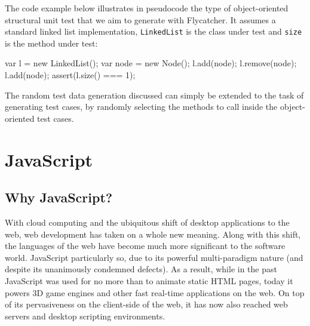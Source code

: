The code example below illustrates in pseudocode the type of object-oriented structural unit test that we aim to generate with \textsf{Flycatcher}. It assumes a standard linked list implementation, \texttt{LinkedList} is the class under test and \texttt{size} is the method under test:

\begin{code}[caption=Object-oriented unit test,label=backgroundexample]
var l = new LinkedList();
var node = new Node();
l.add(node);
l.remove(node);
l.add(node);
assert(l.size() === 1);
\end{code}

The random test data generation discussed can simply be extended to the task of generating test cases, by randomly selecting the methods to call inside the object-oriented test cases.




\section{JavaScript}
\label{overalljs}
\subsection{Why JavaScript?}

With cloud computing and the ubiquitous shift of desktop applications to the web, web development has taken on a whole new meaning. Along with this shift, the languages of the web have become much more significant to the software world. JavaScript particularly so, due to its powerful multi-paradigm nature (and despite its unanimously condemned defects). As a result, while in the past JavaScript was used for no more than to animate static HTML pages, today it powers 3D game engines and other fast real-time applications on the web. On top of its pervasiveness on the client-side of the web, it has now also reached web servers and desktop scripting environments.

